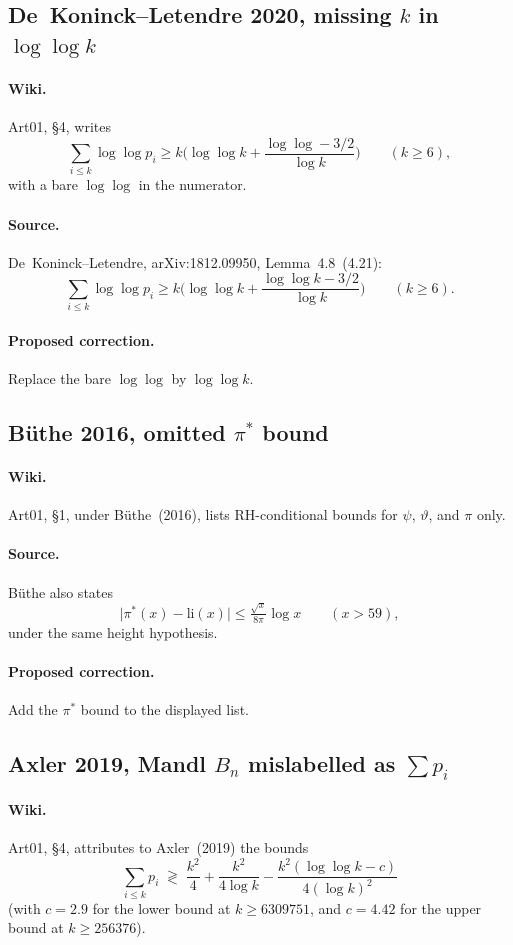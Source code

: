 \documentclass[11pt,a4paper]{article}
\begin{document}
\subsection{De~Koninck--Letendre 2020, missing $k$ in $\log\log k$}
\label{err:dkl-loglog}
\paragraph{Wiki.}
Art01, \S4, writes
\[
\sum_{i\le k}\log\log p_i
\ge k\Biggl(\log\log k+\frac{\log\log - 3/2}{\log k}\Biggr)
\qquad(k\ge 6),
\]
with a bare $\log\log$ in the numerator.
\paragraph{Source.}
De~Koninck--Letendre, arXiv:1812.09950, Lemma~4.8~(4.21):
\[
\sum_{i\le k}\log\log p_i
\ge k\Biggl(\log\log k+\frac{\log\log k - 3/2}{\log k}\Biggr)
\qquad(k\ge 6).
\]
\paragraph{Proposed correction.}
Replace the bare $\log\log$ by $\log\log k$.

\subsection{B\"uthe 2016, omitted $\pi^*$ bound}
\label{err:buthe-pistar}
\paragraph{Wiki.}
Art01, \S1, under B\"uthe~(2016), lists RH-conditional bounds for
$\psi$, $\vartheta$, and $\pi$ only.
\paragraph{Source.}
B\"uthe also states
\[
\bigl|\pi^*(x)-\mathrm{li}(x)\bigr|
\le \tfrac{\sqrt{x}}{8\pi}\log x
\qquad(x>59),
\]
under the same height hypothesis.
\paragraph{Proposed correction.}
Add the $\pi^*$ bound to the displayed list.

\subsection{Axler 2019, Mandl $B_n$ mislabelled as $\sum p_i$}
\label{err:axler-mandl}
\paragraph{Wiki.}
Art01, \S4, attributes to Axler~(2019) the bounds
\[
\sum_{i\le k}p_i
\;\gtrless\;
\frac{k^2}{4}+\frac{k^2}{4\log k}
-\frac{k^2(\log\log k-c)}{4(\log k)^2}
\]
(with $c=2.9$ for the lower bound at $k\ge 6309751$, and $c=4.42$ for the
upper bound at $k\ge 256376$).
\end{document}
